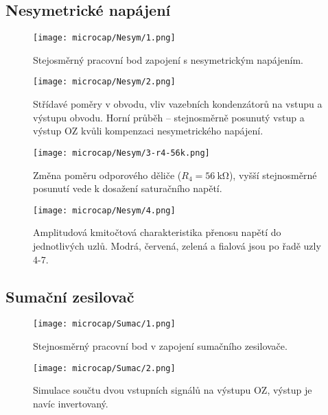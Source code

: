 \subsection{Nesymetrické napájení}
    \begin{figure}[h!]
        \centering
        \texttt{[image: microcap/Nesym/1.png]}
        \centering
        \caption{Stejosměrný pracovní bod zapojení s nesymetrickým napájením.}
        \label{fig:ns-s-pracBod}
    \end{figure}

    \begin{figure}[h!]
        \centering
        \texttt{[image: microcap/Nesym/2.png]}
        \centering
        \caption{Střídavé poměry v obvodu, vliv vazebních kondenzátorů na vstupu a výstupu obvodu. Horní průběh -- stejnosměrně posunutý vstup a výstup OZ kvůli kompenzaci nesymetrického napájení.}
        \label{fig:ns-s-prubeh1}
    \end{figure}

    \begin{figure}[h!]
        \centering
        \texttt{[image: microcap/Nesym/3-r4-56k.png]}
        \centering
        \caption{Změna poměru odporového děliče ($R_4=\qty{56}{\kilo\ohm}$), vyšší stejnosměrné posunutí vede k dosažení saturačního napětí.}
        \label{fig:}
    \end{figure}

    \begin{figure}[h!]
        \centering
        \texttt{[image: microcap/Nesym/4.png]}
        \centering
        \caption{Amplitudová kmitočtová charakteristika přenosu napětí do jednotlivých uzlů. Modrá, červená, zelená a fialová jsou po řadě uzly 4-7.}
        \label{fig:}
    \end{figure}


\clearpage
\subsection{Sumační zesilovač}
        \begin{figure}[h!]
            \centering
            \texttt{[image: microcap/Sumac/1.png]}
            \centering
            \caption{Stejnosměrný pracovní bod v zapojení sumačního zesilovače.}
            \label{fig:}
        \end{figure}

        \begin{figure}[h!]
            \centering
            \texttt{[image: microcap/Sumac/2.png]}
            \centering
            \caption{Simulace součtu dvou vstupních signálů na výstupu OZ, výstup je navíc invertovaný.}
            \label{fig:}
        \end{figure}


